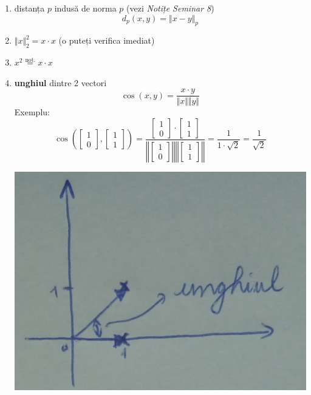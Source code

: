 \documentclass[12pt]{article}
\begin{document}
\begin{enumerate}
		\item distanța $p$ indusă de norma $p$ (vezi \textit{Notițe Seminar 8})
		$$d_p(x,y) = \Vert x - y \Vert_p$$

		\item $\Vert x \Vert_2^2 = x \cdot x$ (o puteți verifica imediat)
		\item $x^2 \stackrel{\text{not.}}{=} x \cdot x$
		\item \textbf{unghiul} dintre 2 vectori
		$$\cos(x,y) = \frac{x \cdot y}{\Vert x\Vert \Vert y\Vert}$$
		Exemplu:
		$$\cos \left(\begin{bmatrix}
		1\\
		0
		\end{bmatrix}, \begin{bmatrix}
		1\\
		1
		\end{bmatrix}\right) = \frac{\begin{bmatrix}
			1\\
			0
			\end{bmatrix} \cdot \begin{bmatrix}
			1\\
			1
			\end{bmatrix}}{ \left\Vert \begin{bmatrix}
			1\\
			0
			\end{bmatrix} \right\Vert \left\Vert \begin{bmatrix}
			1\\
			1
			\end{bmatrix} \right\Vert} = \frac{1}{1 \cdot \sqrt{2}} = \frac{1}{\sqrt{2}}$$
		\begin{center}
			\includegraphics{screenshot003}
		\end{center}
		
	\end{enumerate}
\end{document}
